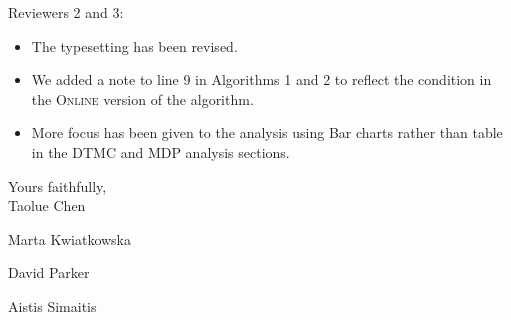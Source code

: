 \documentclass[a4paper,10pt]{article}
\begin{document}
\noindent Reviewers 2 and 3:
\begin{itemize}

\item The typesetting has been revised.
\item We added a note to line 9 in Algorithms 1 and 2 to reflect the condition in the \textsc{Online} version of the algorithm.
\item More focus has been given to the analysis using Bar charts rather than table in the DTMC and MDP analysis sections.


\end{itemize}

\bigskip
\bigskip

\noindent Yours faithfully,\\


\noindent Taolue Chen

\noindent Marta Kwiatkowska

\noindent David Parker

\noindent Aistis Simaitis
\end{document}
